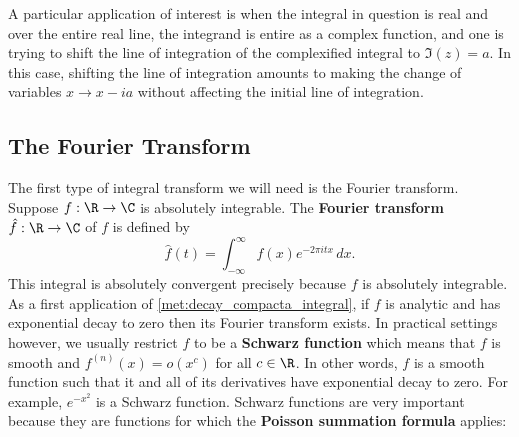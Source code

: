         A particular application of interest is when the integral in question is real and over the entire real line, the integrand is entire as a complex function, and one is trying to shift the line of integration of the complexified integral to $\Im(z) = a$. In this case, shifting the line of integration amounts to making the change of variables $x \to x-ia$ without affecting the initial line of integration.
      \subsection*{The Fourier Transform}
        The first type of integral transform we will need is the Fourier transform. Suppose $f:\R \to \C$ is absolutely integrable. The \textbf{Fourier transform} $\hat{f}:\R \to \C$ of $f$ is defined by
        \[
          \hat{f}(t) = \int_{-\infty}^{\infty}f(x)e^{-2\pi itx}\,dx.
        \]
        This integral is absolutely convergent precisely because $f$ is absolutely integrable. As a first application of \cref{met:decay_compacta_integral}, if $f$ is analytic and has exponential decay to zero then its Fourier transform exists. In practical settings however, we usually restrict $f$ to be a \textbf{Schwarz function} which means that $f$ is smooth and $f^{(n)}(x) = o(x^{c})$ for all $c \in \R$. In other words, $f$ is a smooth function such that it and all of its derivatives have exponential decay to zero. For example, $e^{-x^{2}}$ is a Schwarz function. Schwarz functions are very important because they are functions for which the \textbf{Poisson summation formula} applies:


